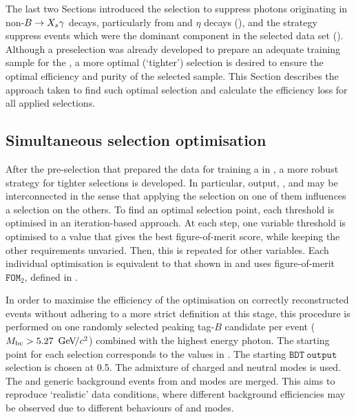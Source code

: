 The last two Sections introduced the selection to suppress photons originating in non-\mbox{$\BtoXsgamma$} decays, particularly from \piz and $\eta$ decays (),
and the strategy suppress \mbox{\epem\ra\qqbar} events which were the dominant component in the selected data set ().
Although a preselection was already developed to prepare an adequate training sample for the \BDT, a more optimal (`tighter') selection is desired to ensure the optimal efficiency and purity of the selected sample.
This Section describes the approach taken to find such optimal selection and calculate the efficiency loss for all applied selections.

\subsection{Simultaneous selection optimisation}\label{sec:simultaneous_optimisation}

After the pre-selection that prepared the data for training a \BDT in , a more robust strategy for tighter selections is developed.
In particular, \BDT output, \piVeto, \etaVeto and \ZMVA may be interconnected in the sense that applying the selection on one of them influences a selection on the others. 
To find an optimal selection point, each threshold is optimised in an iteration-based approach. 
At each step, one variable threshold is optimised to a value that gives the best figure-of-merit score,
while keeping the other requirements unvaried.
Then, this is repeated for other variables.
Each individual optimisation is equivalent to that shown in  and uses figure-of-merit $\mathtt{FOM}_2$, defined in .

In order to maximise the efficiency of the optimisation on correctly reconstructed events without adhering to a more strict definition at this stage, 
this procedure is performed on one randomly selected peaking tag-$B$ candidate per event (${M_{\mathrm{bc}}} >5.27~{\mathrm{\,Ge\kern -0.1em V\!/}c^2}$) combined with the highest energy photon.
The starting point for each selection corresponds to the values in .
The starting $\mathtt{BDT~output}$ selection is chosen at 0.5. 
The \BtoXsgamma admixture of charged and neutral modes is used.
The \epem\ra\qqbar and generic \BB background events from \feiBp and \feiBz modes are merged.
This aims to reproduce `realistic' data conditions, where different background efficiencies may be observed due to different behaviours of \feiBp and \feiBz modes.

